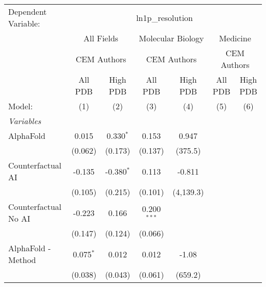 \begingroup
\centering
\begin{tabular}{lcccccc}
   \tabularnewline \midrule \midrule
   Dependent Variable: & \multicolumn{6}{c}{ln1p\_resolution}\\
 & \multicolumn{2}{c}{All Fields} & \multicolumn{2}{c}{Molecular Biology} & \multicolumn{2}{c}{Medicine} \\
\cmidrule(lr){2-3} \cmidrule(lr){4-5} \cmidrule(lr){6-7}
 & \multicolumn{2}{c}{CEM Authors} & \multicolumn{2}{c}{CEM Authors} & \multicolumn{2}{c}{CEM Authors} \\
\cmidrule(lr){2-3} \cmidrule(lr){4-5} \cmidrule(lr){6-7}
 & \multicolumn{1}{c}{All PDB} & \multicolumn{1}{c}{High PDB} & \multicolumn{1}{c}{All PDB} & \multicolumn{1}{c}{High PDB} & \multicolumn{1}{c}{All PDB} & \multicolumn{1}{c}{High PDB} \\
\cmidrule(lr){2-2} \cmidrule(lr){3-3} \cmidrule(lr){4-4} \cmidrule(lr){5-5} \cmidrule(lr){6-6} \cmidrule(lr){7-7}
   Model:                                                     & (1)          & (2)          & (3)           & (4)       & (5) & (6)\\  
   \midrule
   \emph{Variables}\\
   AlphaFold                                                  & 0.015        & 0.330$^{*}$  & 0.153         & 0.947     &     &   \\   
                                                              & (0.062)      & (0.173)      & (0.137)       & (375.5)   &     &   \\   
   Counterfactual AI                                          & -0.135       & -0.380$^{*}$ & 0.113         & -0.811    &     &   \\   
                                                              & (0.105)      & (0.215)      & (0.101)       & (4,139.3) &     &   \\   
   Counterfactual No AI                                       & -0.223       & 0.166        & 0.200$^{***}$ &           &     &   \\   
                                                              & (0.147)      & (0.124)      & (0.066)       &           &     &   \\   
   AlphaFold - Method                                         & 0.075$^{*}$  & 0.012        & 0.012         & -1.08     &     &   \\   
                                                              & (0.038)      & (0.043)      & (0.061)       & (659.2)   &     &   \\   

\end{tabular}
